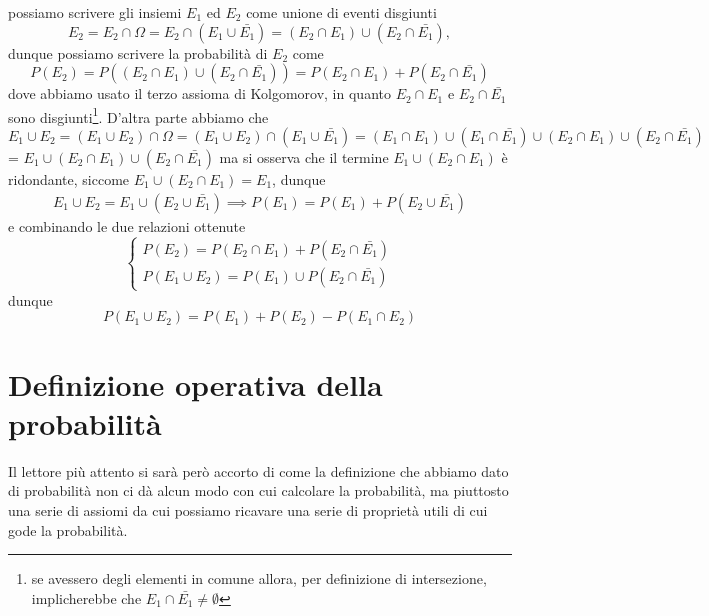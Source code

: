 \documentclass{report}
\begin{document}
	\begin{myproof}
		possiamo scrivere gli insiemi $E_1$ ed $E_2$ come unione di eventi disgiunti
		$$
			E_2 = E_2 \cap \Omega = E_2 \cap (E_1 \cup \bar{E_1}) = (E_2 \cap E_1) \cup (E_2 \cap \bar{E_1}),
		$$
		dunque possiamo scrivere la probabilità di $E_2$ come
		\begin{equation}
			P(E_2) = P \left( (E_2 \cap E_1) \cup (E_2 \cap \bar{E_1}) \right) = P(E_2 \cap E_1) + P(E_2 \cap \bar{E_1})
		\end{equation}
		dove abbiamo usato il terzo assioma di Kolgomorov, in quanto $E_2 \cap E_1$ e $E_2 \cap \bar{E_1}$ sono disgiunti\footnote{se avessero degli elementi in comune allora, per definizione di intersezione, implicherebbe che $E_1 \cap \bar{E_1} \neq \emptyset$}. D'altra parte abbiamo che
		$$
			E_1 \cup E_2 = (E_1 \cup E_2) \cap \Omega = (E_1 \cup E_2) \cap (E_1 \cup \bar{E_1}) = (E_1 \cap E_1) \cup (E_1 \cap \bar{E_1}) \cup (E_2 \cap E_1) \cup (E_2 \cap \bar{E_1})
		$$ = $E_1 \cup (E_2 \cap E_1) \cup (E_2 \cap \bar{E_1})$
		ma si osserva che il termine $E_1 \cup (E_2 \cap E_1)$ è ridondante, siccome $E_1 \cup (E_2 \cap E_1) = E_1$, dunque
		\begin{align*}
			E_1 \cup E_2 = E_1 \cup (E_2 \cup \bar{E_1}) \implies P(E_1) = P(E_1) + P(E_2 \cup \bar{E_1})
		\end{align*}
		e combinando le due relazioni ottenute
		\begin{equation*}			
			\begin{cases}
				P(E_2) = P(E_2 \cap E_1) + P(E_2 \cap \bar{E_1}) \\
				P(E_1 \cup E_2) = P(E_1) \cup P(E_2 \cap \bar{E_1})
			\end{cases}
		\end{equation*}
		dunque
		$$
			P(E_1 \cup E_2) = P(E_1) + P(E_2) - P(E_1 \cap E_2)
		$$
	\end{myproof}
	\section{Definizione operativa della probabilità}
	Il lettore più attento si sarà però accorto di come la definizione che abbiamo dato di probabilità non ci dà alcun modo con cui calcolare la probabilità, ma piuttosto una serie di assiomi da cui possiamo ricavare una serie di proprietà utili di cui gode la probabilità.
\end{document}
